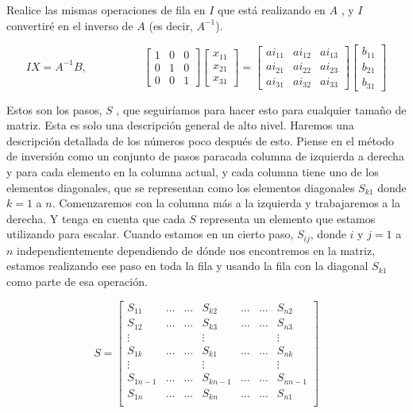 \documentclass[11pt]{article}
\begin{document}
Realice las mismas operaciones de fila en $I$ que está realizando en $A$ , y $I$ convertiré en el inverso de $A$ (es decir, $A^{- 1}$).

\begin{equation}
	IX = A^{- 1} B, \hspace {5em} \begin {bmatrix} 1 & 0 & 0 \\ 0 & 1 & 0 \\ 0 & 0 & 1 \end {bmatrix} \begin {bmatrix} x_{11} \\ x_{21} \\ x_{31} \end {bmatrix} = \begin {bmatrix} ai_{11} & ai_{12} & ai_{13} \\ ai_{21} & ai_{22} & ai_{23} \\ ai_{31} & ai_{32} & ai_ {33} \end {bmatrix} \begin {bmatrix} b_{11} \\ b_{21} \\ b_{31} \end {bmatrix}
\end{equation}

Estos son los pasos, $S$ , que seguiríamos para hacer esto para cualquier tamaño de matriz. Esta es solo una descripción general de alto nivel. Haremos una descripción detallada de los números poco después de esto. Piense en el método de inversión como un conjunto de pasos paracada columna de izquierda a derecha y para cada elemento en la columna actual, y cada columna tiene uno de los elementos diagonales, que se representan como los elementos diagonales $S_{k1}$ donde $k = 1$ a $n$. Comenzaremos con la columna más a la izquierda y trabajaremos a la derecha. Y tenga en cuenta que cada $S$ representa un elemento que estamos utilizando para escalar. Cuando estamos en un cierto paso, $S_{ij}$, donde $i$ y $j=1$ a $n$ independientemente dependiendo de dónde nos encontremos en la matriz, estamos realizando ese paso en toda la fila y usando la fila con la diagonal $S_{k1}$ como parte de esa operación.

\begin{equation}
	S = \begin {bmatrix} S_{11} & \dots & \dots & S_{k2} & \dots & \dots & S_{n2} \\ S_{12} & \dots & \dots & S_{k3} & \dots & \dots & S_{n3} \\ \vdots & & & \vdots & & & \vdots \\ S_{1k} & \dots & \dots & S_{k1} & \dots & \dots & S_{nk} \\ \vdots & & & \vdots & & & \vdots \\ S_{1 n-1} & \dots & \dots & S_{k n-1} & \dots & \dots & S_{n n-1} \\ S_{1n} & \dots & \dots & S_{kn} & \dots & \dots & S_{n1} \\ \end {bmatrix}
\end{equation}
\end{document}
